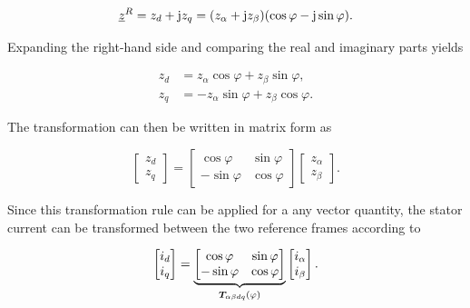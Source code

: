 \begin{equation*}
	\underline{z}^{R} = 
    z_d+\mathrm{j} z_q
	=
	(z_\alpha+\mathrm{j} z_\beta)
	(\cos\varphi-\mathrm{j}\sin\varphi).
	\label{equ:0_sv_transformation_expanded}
\end{equation*}

Expanding the right-hand side and comparing the real and imaginary parts yields

\begin{equation*}
	\begin{split}
		z_d &= z_\alpha\cos\varphi + z_\beta\sin\varphi,\\
		z_q &= -z_\alpha\sin\varphi + z_\beta\cos\varphi.
	\end{split}
\end{equation*}

The transformation can then be written in matrix form as

\begin{equation}
    \begin{bmatrix}
		z_d\\
		z_q
	\end{bmatrix}
	=
	\begin{bmatrix}
		\cos\varphi & \sin\varphi\\
		-\sin\varphi & \cos\varphi
	\end{bmatrix}
    	\begin{bmatrix}
		z_\alpha\\
		z_\beta
	\end{bmatrix}
	.
	\label{equ:0_dq_to_alpha_beta}
\end{equation}

Since this transformation rule can be applied for a any vector quantity, the stator current can be transformed between the two reference frames according to

\begin{equation*}
	\begin{bmatrix}
		i_d\\
		i_q
	\end{bmatrix}
	=
	\underbrace{
		\begin{bmatrix}
			\cos\varphi & \sin\varphi\\
			-\sin\varphi & \cos\varphi
	\end{bmatrix}}_{\bm{T}_{\alpha \beta d q}\left(\varphi\right)}
	\begin{bmatrix}
		i_\alpha\\
		i_\beta
	\end{bmatrix}.
	\label{equ:0_current_alpha_beta_to_dq}
\end{equation*}

